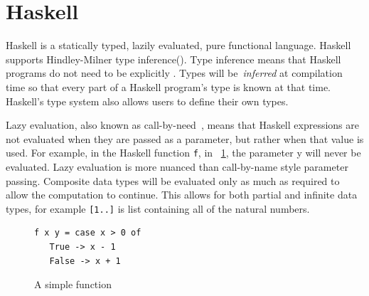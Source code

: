 \section{Haskell}
\label{haskell}
Haskell is a statically typed, lazily evaluated, pure functional language. Haskell \DIFdelbegin {}\DIFdelend \DIFaddbegin {}\DIFaddend supports Hindley-Milner type inference(\cite{hindley}\DIFdelbegin \DIFdel{,}\DIFdelend \DIFaddbegin \DIFadd{;}\DIFaddend \cite{milner}). Type inference means that \DIFdelbegin {}\DIFdelend Haskell programs do not need \DIFdelbegin {}\DIFdelend \DIFaddbegin {}\DIFaddend to be explicitly \DIFdelbegin {}\DIFdelend \DIFaddbegin {}\DIFaddend . Types will be~\textit{inferred} at compilation time so that every part of a Haskell program's type is known at that time. Haskell's type system also allows users to define \DIFaddbegin {}\DIFaddend their own types.

Lazy evaluation, also known as call-by-need~\citep{wadsworth}, means that Haskell expressions are not evaluated when they are passed as a parameter, but rather when that value is used. For example, in the Haskell function \texttt{f}, in \DIFdelbegin {}\DIFdelend \DIFaddbegin {}\DIFaddend ~\ref{lazyY}, the parameter y will never be evaluated. Lazy evaluation is more nuanced than call-by-name style parameter passing. Composite data types will be evaluated only as much as required to allow the computation to continue. This allows for both partial and infinite data types, for example \texttt{[1..]} is \DIFdelbegin {}\DIFdelend \DIFaddbegin {}\DIFaddend list containing all of the natural numbers. 

\begin{figure}[t]
\DIFdelbeginFL %
\DIFdelendFL \DIFaddbeginFL \begin{lstlisting}
f x y = case x > 0 of
   True -> x - 1
   False -> x + 1
\end{lstlisting}
\DIFaddendFL \caption{A simple function}
\label{lazyY}
\end{figure}

